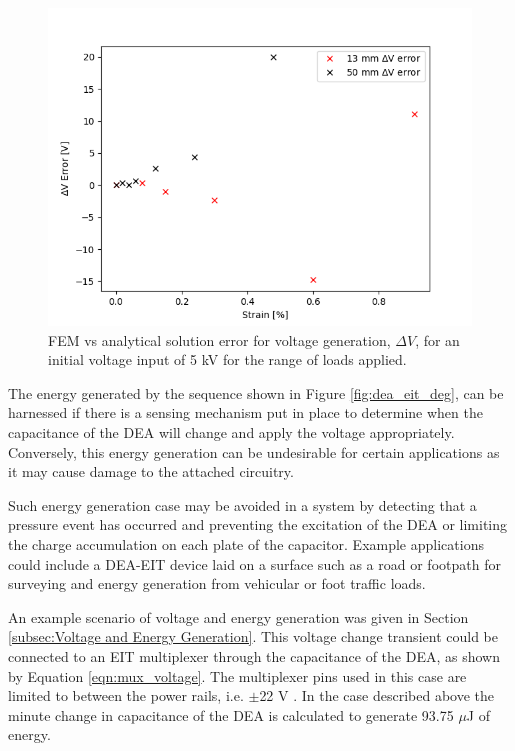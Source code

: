 \begin{figure}[H]
	\centering
	\includegraphics[width=0.65\linewidth]{Figures/plot_DEG_strain_vs_Vgen_err.png}
	\caption{FEM vs analytical solution error for voltage generation, $\Delta V$, for an initial voltage input of 5 kV for the range of loads applied.}
	\label{fig:volt-energy-gen-13_and_50mm_err}
\end{figure}

The energy generated by the sequence shown in Figure \ref{fig:dea_eit_deg}, can be harnessed if there is a sensing mechanism put in place to determine when the capacitance of the DEA will change and apply the voltage appropriately. Conversely, this energy generation can be undesirable for certain applications as it may cause damage to the attached circuitry.

Such energy generation case may be avoided in a system by detecting that a pressure event has occurred and preventing the excitation of the DEA or limiting the charge accumulation on each plate of the capacitor. Example applications could include a DEA-EIT device laid on a surface such as a road or footpath for surveying and energy generation from vehicular or foot traffic loads.

An example scenario of voltage and energy generation was given in Section \ref{subsec:Voltage and Energy Generation}. This voltage change transient could be connected to an EIT multiplexer through the capacitance of the DEA, as shown by Equation \ref{eqn:mux_voltage}. The multiplexer pins used in this case are limited to between the power rails, i.e. $\pm$22 V \cite{VishayPG2018}. In the case described above the minute change in capacitance of the DEA is calculated to generate 93.75 $\mu$J of energy.

